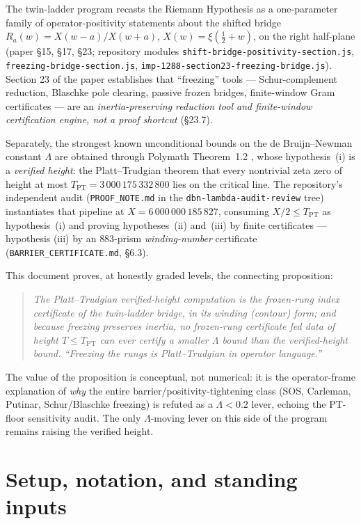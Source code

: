 \documentclass[11pt]{article}
\theoremstyle{definition}
\theoremstyle{remark}
\newcommand{\TPT}{T_{\mathrm{PT}}}
\begin{document}
The twin-ladder program recasts the Riemann Hypothesis as a one-parameter
family of operator-positivity statements about the shifted bridge
$R_a(w)=X(w-a)/X(w+a)$, $X(w)=\xi(\tfrac12+w)$, on the right half-plane
(paper \S15, \S17, \S23; repository modules
\texttt{shift-bridge-positivity-section.js},
\texttt{freezing-bridge-section.js},
\texttt{imp-1288-section23-freezing-bridge.js}). Section 23 of the paper
establishes that ``freezing'' tools --- Schur-complement reduction, Blaschke
pole clearing, passive frozen bridges, finite-window Gram certificates --- are
an \emph{inertia-preserving reduction tool and finite-window certification
engine, not a proof shortcut} (\S23.7).

Separately, the strongest known unconditional bounds on the de Bruijn--Newman
constant $\Lambda$ are obtained through Polymath Theorem~1.2
\cite{Polymath15}, whose hypothesis~(i) is a \emph{verified height}: the
Platt--Trudgian theorem \cite{PlattTrudgian} that every nontrivial zeta zero
of height at most $\TPT=3\,000\,175\,332\,800$ lies on the critical line. The
repository's independent audit (\texttt{PROOF\_NOTE.md} in the
\texttt{dbn-lambda-audit-review} tree) instantiates that pipeline at
$X=6\,000\,000\,185\,827$, consuming $X/2\le\TPT$ as hypothesis~(i) and
proving hypotheses~(ii) and~(iii) by finite certificates --- hypothesis (iii)
by an $883$-prism \emph{winding-number} certificate
(\texttt{BARRIER\_CERTIFICATE.md}, \S6.3).

This document proves, at honestly graded levels, the connecting proposition:
\begin{quote}\itshape
The Platt--Trudgian verified-height computation \emph{is} the frozen-rung
index certificate of the twin-ladder bridge, in its winding (contour) form;
and because freezing preserves inertia, no frozen-rung certificate fed data of
height $T\le\TPT$ can ever certify a smaller $\Lambda$ bound than the
verified-height bound. ``Freezing the rungs is Platt--Trudgian in operator
language.''
\end{quote}
The value of the proposition is conceptual, not numerical: it is the
operator-frame explanation of \emph{why} the entire barrier/positivity-tightening
class (SOS, Carleman, Putinar, Schur/Blaschke freezing) is refuted as a
$\Lambda<0.2$ lever, echoing the PT-floor sensitivity audit. The only
$\Lambda$-moving lever on this side of the program remains raising the
verified height.

\section{Setup, notation, and standing inputs}\label{sec:setup}
\end{document}
